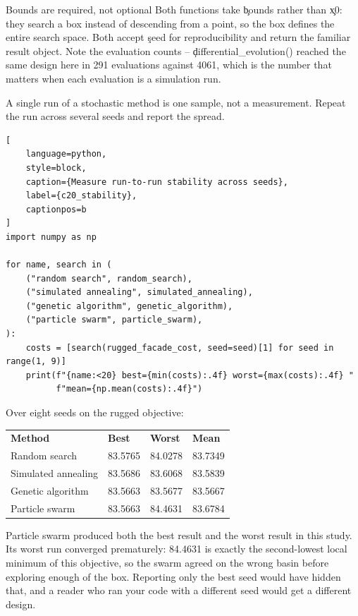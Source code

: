 \begin{SyntaxBox}{Bounds are required, not optional}
Both functions take \c{bounds} rather than \c{x0}: they search a box instead of
descending from a point, so the box defines the entire search space. Both accept
\c{seed} for reproducibility and return the familiar result object. Note the
evaluation counts -- \c{differential_evolution()} reached the same design here
in 291 evaluations against 4061, which is the number that matters when each
evaluation is a simulation run.
\end{SyntaxBox}


A single run of a stochastic method is one sample, not a measurement. Repeat the
run across several seeds and report the spread.

\begin{lstlisting}[
    language=python,
    style=block,
    caption={Measure run-to-run stability across seeds},
    label={c20_stability},
    captionpos=b
]
import numpy as np

for name, search in (
    ("random search", random_search),
    ("simulated annealing", simulated_annealing),
    ("genetic algorithm", genetic_algorithm),
    ("particle swarm", particle_swarm),
):
    costs = [search(rugged_facade_cost, seed=seed)[1] for seed in range(1, 9)]
    print(f"{name:<20} best={min(costs):.4f} worst={max(costs):.4f} "
          f"mean={np.mean(costs):.4f}")
\end{lstlisting}

Over eight seeds on the rugged objective:

\begin{center}
\begin{tabular}{llll}
\textbf{Method} & \textbf{Best} & \textbf{Worst} & \textbf{Mean} \\
Random search & 83.5765 & 84.0278 & 83.7349 \\
Simulated annealing & 83.5686 & 83.6068 & 83.5839 \\
Genetic algorithm & 83.5663 & 83.5677 & 83.5667 \\
Particle swarm & 83.5663 & 84.4631 & 83.6784 \\
\end{tabular}
\end{center}

Particle swarm produced both the best result and the worst result in this study.
Its worst run converged prematurely: 84.4631 is exactly the second-lowest local
minimum of this objective, so the swarm agreed on the wrong basin before
exploring enough of the box. Reporting only the best seed would have hidden
that, and a reader who ran your code with a different seed would get a different
design.

